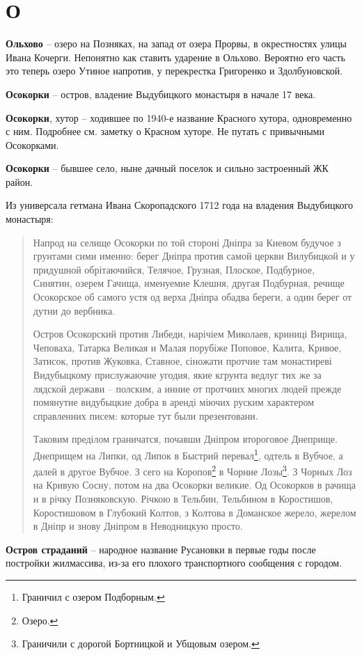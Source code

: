\chapter*{О}

\textbf{Ольхово} – озеро на Позняках, на запад от озера Прорвы, в окрестностях улицы Ивана Кочерги. Непонятно как ставить ударение в Ольхово. Вероятно его часть это теперь озеро Утиное напротив, у перекрестка Григоренко и Здолбуновской.\\

\medskip


\textbf{Осокорки} – остров, владение Выдубицкого монастыря в начале 17 века.\\

\medskip

\textbf{Осокорки}, хутор – ходившее по 1940-е название Красного хутора, одновременно с ним. Подробнее см. заметку о Красном хуторе. Не путать с привычными Осокорками.\\

\medskip

\textbf{Осокорки} – бывшее село, ныне дачный поселок и сильно застроенный ЖК район.

Из универсала гетмана Ивана Скоропадского 1712 года на владения Выдубицкого монастыря:

\begin{quotation}
Напрод на селище Осокорки по той стороні Дніпра за Киевом будучое з грунтами сими именно: берег Дніпра против самой церкви Вилубицкой и у придушной обрітаючийся, Телячое, Грузная, Плоское, Подбурное, Синятин, озерем Гачища, именуемие Клешня, другая Подбурная, речище Осокорское об самого устя од верха Дніпра обадва береги, а один берег от дутни до вербника.

Остров Осокорский против Либеди, нарічіем Миколаев, криниці Вирища, Чеповаха, Татарка Великая и Малая порубіже Поповое, Калита, Кривое, Затисок, против Жуковка, Ставное, сіножати протчие там монастиреві Видубыцкому прислужаючие угодия, якие кгрунта ведлуг тих же за лядской держави – полским, а инние от протчиих многих людей прежде помянутие видубыцкие добра в аренді міючих руским характером справленних писем: которые тут были презентовани.

Таковим преділом граничатся, почавши Дніпром второговое Днеприще. Днеприщем на Липки, од Липок в Быстрий перевал\footnote{Граничил с озером Подборным.}, одтель в Вубчое, а далей в другое Вубчое. З сего на Коропов\footnote{Озеро.} в Чорние Лозы\footnote{Граничили с дорогой Бортницкой и Убщовым озером.}. З Чорных Лоз на Кривую Сосну, потом на два Осокорки великие. Од Осокорков в рачища и в річку Позняковскую. Річкою в Тельбин, Тельбином в Коростишов, Коростишовом в Глубокий Колтов, з Колтова в Доманское жерело, жерелом в Дніпр и знову Дніпром в Неводницкую просто.
\end{quotation}

\medskip

\textbf{Остров страданий} – народное название Русановки в первые годы после постройки жилмассива, из-за его плохого транспортного сообщения с городом.

